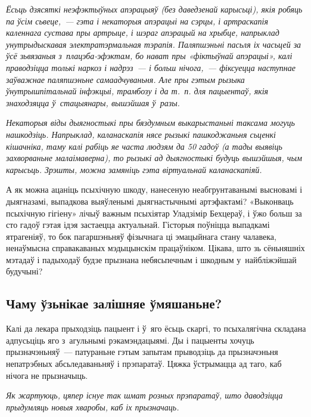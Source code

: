 \emph{Ёсьць дзясяткі неэфэктыўных апэрацыяў (без даведзенай карысьці), якія робяць па ўсім сьвеце,~--- гэта і некаторыя апэрацыі на сэрцы, і артраскапія каленнага сустава пры артрыце, і шэраг апэрацый на хрыбце, напрыклад унутрыдыскавая электратэрмальная тэрапія. Паляпшэньні пасьля іх часьцей за ўсё зьвязаныя з~плацэба-эфэктам, бо нават пры «фіктыўнай апэрацыі», калі праводзіцца толькі наркоз і надрэз~--- і больш нічога,~--- фіксуецца наступнае заўважнае паляпшэньне самаадчуваньня. Але пры гэтым рызыка ўнутрышпітальнай інфэкцыі, трамбозу і да т.~п. для пацыентаў, якія знаходзяцца ў~стацыянары, вышэйшая ў~разы.}

\emph{Некаторыя віды дыягностыкі пры бяздумным выкарыстаньні таксама могуць нашкодзіць. Напрыклад, каланаскапія нясе рызыкі пашкоджаньня сьценкі кішачніка, таму калі рабіць яе часта людзям да 50 гадоў (а тады выявіць захворваньне малаімаверна), то рызыкі ад дыягностыкі будуць вышэйшыя, чым карысьць. Зрэшты, можна замяніць гэта віртуальнай каланаскапіяй.}

А як можна ацаніць псыхічную шкоду, нанесеную неабгрунтаванымі высновамі і дыягназамі, выпадкова выяўленымі дыягнастычнымі артэфактамі? «Выконваць псыхічную гігіену» лічыў важным псыхіятар Уладзімір Бехцераў, і ўжо больш за сто гадоў гэтая ідэя застаецца актуальнай. Гісторыя поўніцца выпадкамі ятрагеніяў, то бок пагаршэньняў фізычнага ці эмацыйнага стану чалавека, ненаўмысна справакаваных мэдыцынскім працаўніком. Цікава, што зь сёньняшніх мэтадаў і падыходаў будзе прызнана небясьпечным і шкодным у~найбліжэйшай будучыні? 


\subsection*{Чаму ўзьнікае залішняе ўмяшаньне?}

Калі да лекара прыходзіць пацыент і ў~яго ёсьць скаргі, то псыхалягічна складана адпусьціць яго з~агульнымі рэкамэндацыямі. Ды і пацыенты хочуць прызначэньняў~--- патураньне гэтым запытам прыводзіць да прызначэньня непатрэбных абсьледаваньняў і прэпаратаў. Цяжка ўстрымацца ад таго, каб нічога не прызначыць. 

\emph{Як жартуюць, цяпер існуе так шмат розных прэпаратаў, што даводзіцца прыдумляць новыя хваробы, каб іх прызначаць.}

